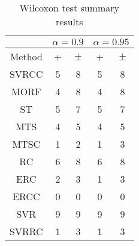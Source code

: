 \documentclass[a4paper,10pt]{article}
\begin{document}
 \clearpage 


\begin{table}[!htp]
\centering\scriptsize
\begin{tabular}{
|c|c|c|c|c|}
\hline
&\multicolumn{2}{c|}{$\alpha=0.9$} & \multicolumn{2}{c|}{$\alpha=0.95$}\\\hline
Method & + & $\pm$ & + & $\pm$ \\
\hline
SVRCC & 5 & 8 & 5 & 8\\
\hline
MORF & 4 & 8 & 4 & 8\\
\hline
ST & 5 & 7 & 5 & 7\\
\hline
MTS & 4 & 5 & 4 & 5\\
\hline
MTSC & 1 & 2 & 1 & 3\\
\hline
RC & 6 & 8 & 6 & 8\\
\hline
ERC & 2 & 3 & 1 & 3\\
\hline
ERCC & 0 & 0 & 0 & 0\\
\hline
SVR & 9 & 9 & 9 & 9\\
\hline
SVRRC & 1 & 3 & 1 & 3\\
\hline

\end{tabular}
\caption{Wilcoxon test summary results}

\end{table}

 \clearpage 
\end{document}
